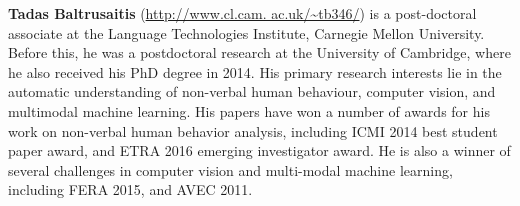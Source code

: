   {\bfseries Tadas Baltrusaitis} (\url{http://www.cl.cam. ac.uk/~tb346/}) is a post-doctoral associate at the Language Technologies Institute, Carnegie Mellon University. Before this, he was a postdoctoral research at the University of Cambridge, where he also received his PhD degree in 2014. His primary research interests lie in the automatic understanding of non-verbal human behaviour, computer vision, and multimodal machine learning. His papers have won a number of awards for his work on non-verbal human behavior analysis, including ICMI 2014 best student paper award, and ETRA 2016 emerging investigator award. He is also a winner of several challenges in computer vision and multi-modal machine learning, including FERA 2015, and AVEC 2011.
